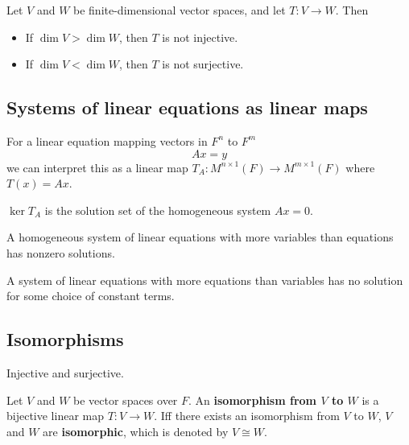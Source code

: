 \begin{theorem}
  Let $V$ and $W$ be finite-dimensional vector spaces, and let $T : V \to W$. Then
  \begin{itemize}
    \item If $\dim V > \dim W$, then $T$ is not injective.
    \item If $\dim V < \dim W$, then $T$ is not surjective.
  \end{itemize}
\end{theorem}

\subsection{Systems of linear equations as linear maps}

\begin{definition}
  For a linear equation mapping vectors in $F^n$ to $F^m$ 
  \[
    Ax = y
  \]
  we can interpret this as a linear map $T_A : M^{n \times 1}(F) \to M^{m \times 1}(F)$ where $T(x) = Ax$.
\end{definition}

\begin{theorem}
  $\ker T_A$ is the solution set of the homogeneous system $Ax = 0$.
\end{theorem}

\begin{theorem}
  A homogeneous system of linear equations with more variables than equations has nonzero solutions.

  A system of linear equations with more equations than variables has no solution for some choice of constant terms.
\end{theorem}

\subsection{Isomorphisms}

\begin{definition}[Bijective]
  Injective and surjective.
\end{definition}

\begin{definition}[Isomorphism]
  Let $V$ and $W$ be vector spaces over $F$. An \textbf{isomorphism from $V$ to $W$} is a bijective linear map $T : V \to W$. Iff there exists an isomorphism from $V$ to $W$, $V$ and $W$ are \textbf{isomorphic}, which is denoted by $V \cong W$.
\end{definition}


